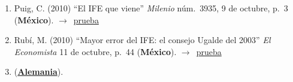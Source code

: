 \documentclass[12 pt, letter]{article}
\newenvironment{CitasMiTrabajo}{
    \begin{footnotesize}
    \begin{enumerate}[label={\footnotesize\emph{cita~\arabic*}},ref=\arabic*] %
        \setlength{\itemsep}{.1\itemsep}
        \setlength{\parskip}{.1\parskip}
    }{\end{enumerate}\end{footnotesize}}
\begin{document}
        \begin{CitasMiTrabajo}

        \item Puig, C. (2010)
        ``El
        IFE que viene'' \emph{Milenio} n\'um.\ 3935, 9 de octubre, p.~3 (\textbf{M\'exico}). $\rightarrow$~\href{http://ericmagar.com/cv/cites/magarEtalIFEDinam/puig.pdf}{prueba}

        \item Rub\'i, M. (2010)
        ``Mayor error del IFE: el consejo Ugalde del 2003'' \emph{El Economista} 11 de octubre, p.~44 (\textbf{M\'exico}). $\rightarrow$~\href{http://ericmagar.com/cv/cites/magarEtalIFEDinam/rubi.pdf}{prueba}

        \item {} (\href{http://ericmagar.com/cv/cites/magarEtalIFEDinam/lara2015.pdf}{\textbf{Alemania}}).

%
          
        \label{ncites:magar.estevez.rosas.2010} %

        \end{CitasMiTrabajo}







\end{document}
